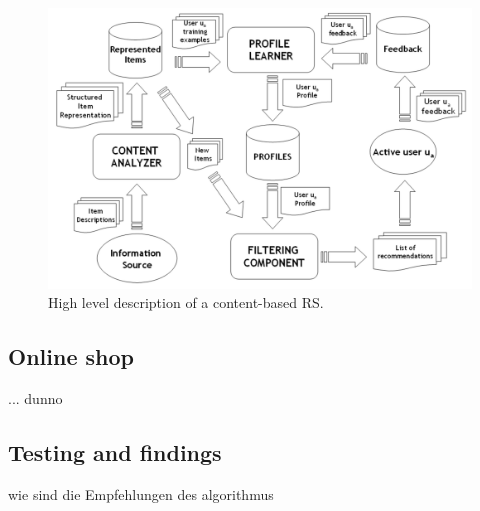 \begin{figure}[h]
    \center
    \includegraphics[scale=0.3]{inc/implementation/HighlevelContentBased}
    \caption{High level description of a content-based RS.\citep[p.~76]{lops:2011}}
    \label{fig:framework-contentbasedrs}
\end{figure}



\FloatBarrier

\FloatBarrier

\FloatBarrier


\subsection{Online shop}
... dunno

\subsection{Testing and findings}
wie sind die Empfehlungen des algorithmus




